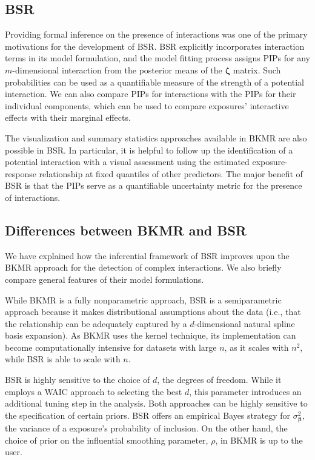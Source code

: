 \documentclass[12pt, twoside]{amherstthesis}
\begin{document}
\hypertarget{bsr-1}{%
\subsection{BSR}\label{bsr-1}}

Providing formal inference on the presence of interactions was one of the primary motivations for the development of BSR. BSR explicitly incorporates interaction terms in its model formulation, and the model fitting process assigns PIPs for any \(m\)-dimensional interaction from the posterior means of the \(\boldsymbol\zeta\) matrix. Such probabilities can be used as a quantifiable measure of the strength of a potential interaction. We can also compare PIPs for interactions with the PIPs for their individual components, which can be used to compare exposures' interactive effects with their marginal effects.

The visualization and summary statistics approaches available in BKMR are also possible in BSR. In particular, it is helpful to follow up the identification of a potential interaction with a visual assessment using the estimated exposure-response relationship at fixed quantiles of other predictors. The major benefit of BSR is that the PIPs serve as a quantifiable uncertainty metric for the presence of interactions.

\hypertarget{differences-between-bkmr-and-bsr}{%
\subsection{Differences between BKMR and BSR}\label{differences-between-bkmr-and-bsr}}

We have explained how the inferential framework of BSR improves upon the BKMR approach for the detection of complex interactions. We also briefly compare general features of their model formulations.

While BKMR is a fully nonparametric approach, BSR is a semiparametric approach because it makes distributional assumptions about the data (i.e., that the relationship can be adequately captured by a \(d\)-dimensional natural spline basis expansion). As BKMR uses the kernel technique, its implementation can become computationally intensive for datasets with large \(n\), as it scales with \(n^2\), while BSR is able to scale with \(n\).

BSR is highly sensitive to the choice of \(d\), the degrees of freedom. While it employs a WAIC approach to selecting the best \(d\), this parameter introduces an additional tuning step in the analysis. Both approaches can be highly sensitive to the specification of certain priors. BSR offers an empirical Bayes strategy for \(\sigma^2_{\boldsymbol\beta}\), the variance of a exposure's probability of inclusion. On the other hand, the choice of prior on the influential smoothing parameter, \(\rho\), in BKMR is up to the user.
\end{document}
